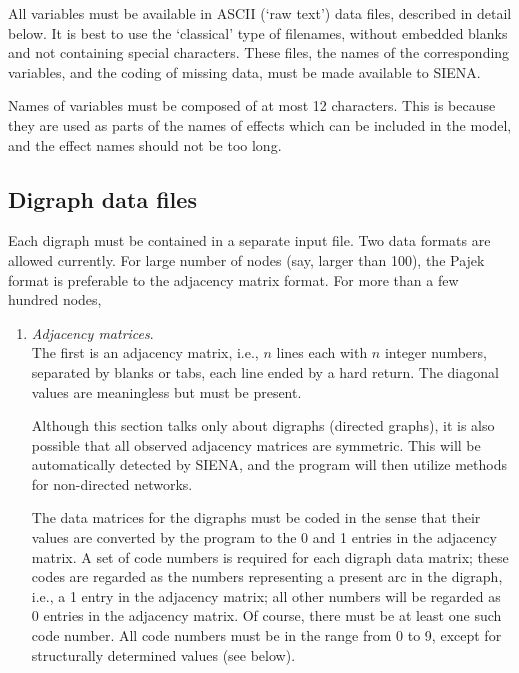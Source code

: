 \documentclass[a4paper,fleqn]{article}
\newcommand{\+}{\, + \,}
\newcommand{\si}{{\sf SIENA}}
\begin{document}
{All variables must be available in ASCII (`raw text') data files, described in
detail below. It is best to use the `classical' type of filenames, without embedded blanks
and not containing special characters.
These files, the names of the corresponding
variables, and the coding of missing data, must be made available
to \si.

Names of variables must be composed of at most 12 characters. This
is because they are used as parts of the names of effects which
can be included in the model, and the effect names should not be
too long.

\begin{screen}
\end{screen}
\subsection{Digraph data files}

Each digraph must be contained in a separate input file.  Two data formats are
allowed currently.  For large number of nodes (say, larger than 100), the Pajek
format is preferable to the adjacency matrix format.  For more than a few
hundred nodes,
\begin{enumerate}
\item \emph{Adjacency matrices}.\\
      The first is an adjacency matrix, i.e., $n$ lines each with $n$ integer
      numbers, separated by blanks or tabs, each line ended by a hard return.
      The diagonal values are meaningless but must be present.

      Although this section talks only about digraphs (directed graphs), it is
      also possible that all observed adjacency matrices are symmetric.
      This will be automatically detected by \si, and
      the program will then utilize methods for non-directed networks.

      The data matrices for the digraphs
       must be coded in the sense
      that their values are converted by the program to the 0 and 1
      entries in the adjacency matrix. A set of code numbers is required
      for each digraph data matrix; these codes are regarded as the
      numbers representing a present arc in the digraph, i.e., a 1 entry
      in the adjacency matrix; all other numbers will be regarded as 0
      entries in the adjacency matrix. Of course, there must be at least
      one such code number. All code numbers must be in the range from 0
      to 9, except for structurally determined values (see below).


\end{enumerate}}
\end{document}
